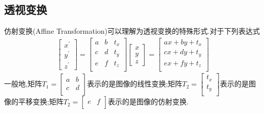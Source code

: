 \documentclass[UTF8,a4paper,10pt]{ctexart}
\begin{document}
\begin{flushleft}
        \subsection{透视变换}
        \hspace{2em}仿射变换(Affine Transformation)可以理解为透视变换的特殊形式.对于下列表达式\\
        \begin{eqnarray}
            \left[\begin{array}{c}
                x^{\prime}\\
                y^{\prime}\\
                z^{\prime}
            \end{array}\right]=\left[\begin{array}{ccc}
                a & b & t_{x}\\
                c & d & t_{y}\\
                e & f & t_{z}\\
            \end{array}\right]\left[\begin{array}{c}
                x\\
                y\\
                z
            \end{array}\right]=\left[\begin{array}{c}
                ax+by+t_{x}\\
                cx+dy+t_{y}\\
                ex+fy+t_{z}\\
            \end{array}\right]\nonumber
        \end{eqnarray}
        一般地,矩阵$T_{1}=\left[\begin{array}{cc}
            a & b \\
            c & d \\
        \end{array}\right]$表示的是图像的线性变换;矩阵$T_{2}=\left[\begin{array}{c}
            t_{x}\\
            t_{y}\\
        \end{array}\right]$表示的是图像的平移变换;矩阵$T_{2}=\left[\begin{array}{cc}
            e & f\\
        \end{array}\right]$表示的是图像的仿射变换.\\


\end{flushleft}
\end{document}
